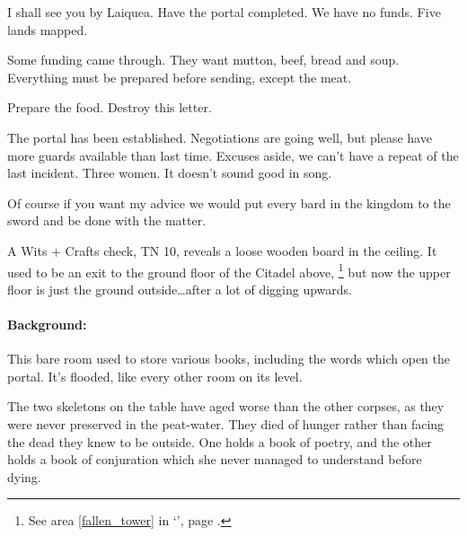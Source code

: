 \begin{multicols}{2}
\begin{exampletext}

  I shall see you by Laiquea.  Have the portal completed.  We have no funds.  Five lands mapped.

\end{exampletext}

\begin{exampletext}

  Some funding came through.  They want mutton, beef, bread and soup.  Everything must be prepared before sending, except the meat.

  Prepare the food.  Destroy this letter.

\end{exampletext}

\begin{exampletext}

  The portal has been established.  Negotiations are going well, but please have more guards available than last time.  Excuses aside, we can't have a repeat of the last incident.  Three women.  It doesn't sound good in song.

  Of course if you want my advice we would put every bard in the kingdom to the sword and be done with the matter.

\end{exampletext}

A Wits + Crafts check, TN 10, reveals a loose wooden board in the ceiling.
It used to be an exit to the ground floor of the Citadel above,%
\footnote{See area \ref{fallen_tower} in `', page \pageref{fallen_tower}.}
but now the upper floor is just the ground outside\ldots after a lot of digging upwards.


\paragraph{Background:}
This bare room used to store various books, including the words which open the portal.
It's flooded, like every other room on its level.

The two skeletons on the table have aged worse than the other corpses, as they were never preserved in the peat-water.
They died of hunger rather than facing the dead they knew to be outside.
One holds a book of poetry, and the other holds a book of conjuration which she never managed to understand before dying.

\begin{boxtext}


\end{boxtext}
\end{multicols}

